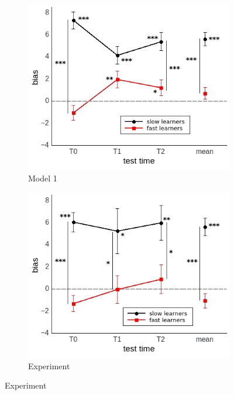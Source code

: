 \documentclass[a4paper]{scrreprt}
\begin{document}
\begin{figure}
\centering
\begin{subfigure}[b]{0.49\textwidth}
        \includegraphics[width=\textwidth]{figs/sec3/pred/pred_mod1mod1.jpeg}
        \caption{Model 1}
    \end{subfigure}
    \begin{subfigure}[b]{0.49\textwidth}
        \includegraphics[width=\textwidth]{figs/sec3/pred/pred_mod1dat.jpeg}
        \caption{Experiment}
    \end{subfigure}


\end{figure}
\end{document}
